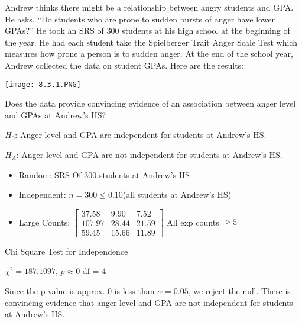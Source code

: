 \documentclass[../stats.tex]{subfiles}
\begin{document}
\begin{example}
    Andrew thinks there might be a relationship between angry students and GPA. He asks, ``Do students who are prone to sudden bursts of anger have lower GPAs?'' He took an SRS of 300 students at his high school at the beginning of the year. He had each student take the Spielberger Trait Anger Scale Test which measures how 
    prone a person is to sudden anger. At the end of the school year, Andrew collected the data on student GPAs. Here are the results:
    \begin{center}
        \texttt{[image: 8.3.1.PNG]}
    \end{center}
    Does the data provide convincing evidence of an association between anger level and GPAs at Andrew's HS?

    $H_0$: Anger level and GPA are independent for students at Andrew's HS.

    $H_A$: Anger level and GPA are not independent for students at Andrew's HS.

    \begin{itemize}
        \item Random: SRS Of 300 students at Andrew's HS 
        \item Independent: $n=300\leq 0.10$(all students at Andrew's HS)
        \item Large Counts: $\begin{bmatrix}
            37.58 & 9.90 & 7.52\\
            107.97 & 28.44 & 21.59\\
            59.45&15.66&11.89
        \end{bmatrix}$ All exp counts $\geq 5$
    \end{itemize}
    Chi Square Test for Independence

    $\chi^2=187.1097$, $p\approx 0$ df = 4

    Since the p-value is approx. 0 is less than $\alpha = 0.05$, we reject the null. There is convincing evidence that anger level and GPA are not independent for students at Andrew's HS.
\end{example}
\end{document}
